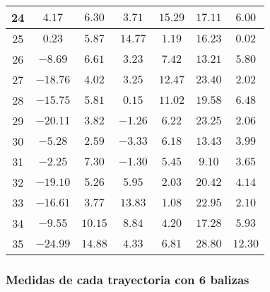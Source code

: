 \begin{table}[H]
\begin{tabular}{|c|c|c|c|c|c|c|}
                        24  & $4.17$    &  $6.30$   &  $3.71$    &  $15.29$  & $17.11$  &  $6.00$   \\ \hline
                        25  & $0.23$    &  $5.87$   &  $14.77$   &  $1.19$   & $16.23$  &  $0.02$   \\ \hline
                        26  & $-8.69$   &  $6.61$   &  $3.23$    &  $7.42$   & $13.21$  &  $5.80$   \\ \hline
                        27  & $-18.76$  &  $4.02$   &  $3.25$    &  $12.47$  & $23.40$  &  $2.02$   \\ \hline
                        28  & $-15.75$  &  $5.81$   &  $0.15$    &  $11.02$  & $19.58$  &  $6.48$   \\ \hline
                        29  & $-20.11$  &  $3.82$   &  $-1.26$   &  $6.22$   & $23.25$  &  $2.06$   \\ \hline
                        30  & $-5.28$   &  $2.59$   &  $-3.33$   &  $6.18$   & $13.43$  &  $3.99$   \\ \hline
                        31  & $-2.25$   &  $7.30$   &  $-1.30$   &  $5.45$   & $9.10$   &  $3.65$   \\ \hline
                        32  & $-19.10$  &  $5.26$   &  $5.95$    &  $2.03$   & $20.42$  &  $4.14$   \\ \hline
                        33  & $-16.61$  &  $3.77$   &  $13.83$   &  $1.08$   & $22.95$  &  $2.10$   \\ \hline
                        34  & $-9.55$   &  $10.15$  &  $8.84$    &  $4.20$   & $17.28$  &  $5.93$   \\ \hline
                        35  & $-24.99$  &  $14.88$  &  $4.33$    &  $6.81$   & $28.80$  &  $12.30$  \\ \hline
        \end{tabular}
    \label{tab:media_fisica_6_total}
\end{table}

\subsubsection{Medidas de cada trayectoria con 6 balizas}


